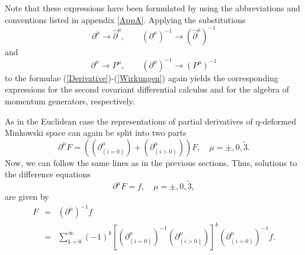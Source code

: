 \documentclass[a4paper,11pt,oneside]{article}
\begin{document}
Note that these expressions have been formulated by using the abbreviations
and conventions listed in appendix \ref{AppA}. Applying the substitutions 
\begin{equation}
\partial ^{\mu}\rightarrow \hat{\partial}^{\mu},\qquad \left( \partial
^{\mu}\right) ^{-1}\rightarrow \left( \hat{\partial}^{\mu}\right) ^{-1}
\end{equation}
and 
\begin{equation}
\partial ^{\mu}\rightarrow P^{\mu},\qquad \left( \partial ^{\mu}\right)
^{-1}\rightarrow \left( P^{\mu}\right) ^{-1}
\end{equation} 
to the formulae (\ref{Derivative})-(\ref{Wirkungen}) again yields the
corresponding expressions for the second covariant differential calculus and
for the algebra of momentum generators, respectively.

As in the Euclidean case the representations of partial derivatives of
q-deformed Minkowski space \cite{BW01} can again be split into two parts
\begin{equation}
\partial ^{\mu}F=\left( \left( \partial _{(i=0)}^{\mu}\right) +\left( \partial
_{\left( i>0\right) }^{\mu}\right) \right) F, \quad \mu=\pm, 0,\tilde{3}.
\end{equation}
Now, we can follow the same lines as in the previous sections. Thus,
solutions to the difference equations 
\begin{equation}
\partial ^{\mu}F=f,\quad \mu=\pm ,0,\tilde{3},
\end{equation}
are given by 
\begin{eqnarray}
F &=&\left( \partial ^{\mu}\right) ^{-1}f  \label{IntegralM} \\
&=&\sum_{k=0}^{\infty }\left( -1\right) ^{k}\left[ \left( \partial _{\left(
i=0\right) }^{\mu}\right) ^{-1}\left( \partial _{\left( i>0\right)
}^{\mu}\right) \right] ^{k}\left( \partial _{\left( i=0\right) }^{\mu}\right)
^{-1}f.  \nonumber
\end{eqnarray}
\end{document}
